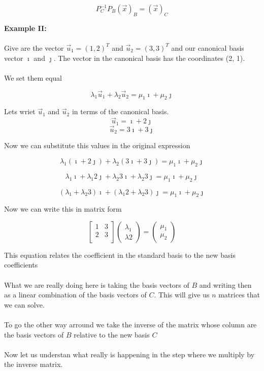 \[P_{C}^{-1} P_B (\vec{x})_B = (\vec{x})_C\]

\textbf{Example II:}
\\\\
Give are the vector \(\vec{u}_1 = (1,2)^T\) and \(\vec{u}_2 = (3, 3)^T\)
and our canonical basis vector \(\imath\) and \(\jmath\). The
vector in the canonical basis has the coordinates (2, 1). 
\\\\
We set them equal

\[\lambda_1 \vec{u}_1 + \lambda_2 \vec{u}_2 = \mu_1 \imath + \mu_2 \jmath \]

Lets wriet \(\vec{u}_1\) and \(\vec{u}_2\) in terms of the canonical basis.
\[\vec{u}_1 = \imath + 2 \jmath\]
\[\vec{u}_2 = 3 \imath + 3 \jmath\]

Now we can substitute this values in the original expression

\[\lambda_1 (\imath + 2 \jmath) + \lambda_2 (3 \imath + 3 \jmath) = \mu_1 \imath + \mu_2 \jmath \]

\[\lambda_1 \imath + \lambda_1 2 \jmath + \lambda_2 3 \imath + \lambda_2 3 \jmath = \mu_1 \imath + \mu_2 \jmath \]

\[(\lambda_1  +  \lambda_2 3)\imath + (\lambda_1 2  + \lambda_2 3) \jmath = \mu_1 \imath + \mu_2 \jmath \]

Now we can write this in matrix form

\[
\begin{bmatrix}
    1 & 3 \\
    2 & 3 \\
\end{bmatrix} \begin{pmatrix}
    \lambda_1 \\ \lambda2
\end{pmatrix} = \begin{pmatrix}
    \mu_1 \\ \mu_2
\end{pmatrix}
\]

This equation relates the coefficient in the standard basis to the new basis
coefficients
\\\\
What we are really doing here is taking the basis vectors of \(B\) and writing then as a linear combination
of the basis vectors of \(C\). This will give us \(n\) matrices that we can solve.
\\\\
To go the other way arround we take the inverse of the matrix whose column are the basis vectors of \(B\)
relative to the new basis \(C\)
\\\\
Now let us understan what really is happening in the step where we multiply by the inverse matrix.

